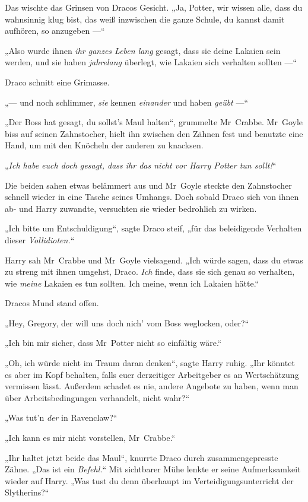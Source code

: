 {Das wischte das Grinsen von Dracos Gesicht. „Ja, Potter, wir wissen alle, dass du wahnsinnig klug bist, das weiß inzwischen die ganze Schule, du kannst damit aufhören, so anzugeben —“

„Also wurde ihnen \emph{ihr ganzes Leben lang} gesagt, dass sie deine Lakaien sein werden, und sie haben \emph{jahrelang} überlegt, wie Lakaien sich verhalten sollten —“

Draco schnitt eine Grimasse.

„— und noch schlimmer, \emph{sie} kennen \emph{einander} und haben \emph{geübt} —“

„Der Boss hat gesagt, du sollst's Maul halten“, grummelte Mr~Crabbe. Mr~Goyle biss auf seinen Zahnstocher, hielt ihn zwischen den Zähnen fest und benutzte eine Hand, um mit den Knöcheln der anderen zu knacksen.

„\emph{Ich habe euch doch gesagt, dass ihr das nicht vor Harry Potter tun sollt!}“

Die beiden sahen etwas belämmert aus und Mr~Goyle steckte den Zahnstocher schnell wieder in eine Tasche seines Umhangs. Doch sobald Draco sich von ihnen ab- und Harry zuwandte, versuchten sie wieder bedrohlich zu wirken.

„Ich bitte um Entschuldigung“, sagte Draco steif, „für das beleidigende Verhalten dieser \emph{Vollidioten.}“

Harry sah Mr~Crabbe und Mr~Goyle vielsagend. „Ich würde sagen, dass du etwas zu streng mit ihnen umgehst, Draco. \emph{Ich} finde, dass sie sich genau so verhalten, wie \emph{meine} Lakaien es tun sollten. Ich meine, wenn ich Lakaien hätte.“

Dracos Mund stand offen.

„Hey, Gregory, der will uns doch nich' vom Boss weglocken, oder?“

„Ich bin mir sicher, dass Mr~Potter nicht so einfältig wäre.“

„Oh, ich würde nicht im Traum daran denken“, sagte Harry ruhig. „Ihr könntet es aber im Kopf behalten, falls euer derzeitiger Arbeitgeber es an Wertschätzung vermissen lässt. Außerdem schadet es nie, andere Angebote zu haben, wenn man über Arbeitsbedingungen verhandelt, nicht wahr?“

„Was tut'n \emph{der} in Ravenclaw?“

„Ich kann es mir nicht vorstellen, Mr~Crabbe.“

„Ihr haltet jetzt beide das Maul“, knurrte Draco durch zusammengepresste Zähne. „Das ist ein \emph{Befehl.}“ Mit sichtbarer Mühe lenkte er seine Aufmerksamkeit wieder auf Harry. „Was tust du denn überhaupt im Verteidigungsunterricht der Slytherins?“

}

